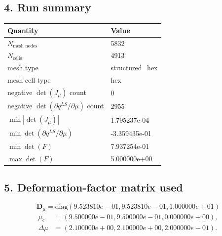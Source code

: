 \documentclass[11pt]{article}
\begin{document}
\subsection*{4. Run summary}
\begin{center}
\begin{tabular}{ll}
\toprule
Quantity & Value \\
\midrule
$N_\text{mesh nodes}$ & 5832 \\
$N_\text{cells}$ & 4913 \\
mesh type & structured_hex \\
mesh cell type & hex \\
negative $\det(J_\mu)$ count & 0 \\
negative $\det(\partial q^{LS}/\partial\mu)$ count & 2955 \\
$\min |\det(J_\mu)|$ & 1.795237e-04 \\
$\min\det(\partial q^{LS}/\partial\mu)$ & -3.359435e-01 \\
$\min\det(F)$ & 7.937254e-01 \\
$\max\det(F)$ & 5.000000e+00 \\
\bottomrule
\end{tabular}
\end{center}
\subsection*{5. Deformation-factor matrix used}
\begin{equation}
\mathbf{D}_{\mu}=\mathrm{diag}\left(9.523810e-01,9.523810e-01,1.000000e+01\right)\end{equation}
\begin{align}
\mu_c &= \left(9.500000e-01,9.500000e-01,0.000000e+00\right),\\
\Delta\mu &= \left(2.100000e+00,2.100000e+00,2.000000e-01\right).
\end{align}
\end{document}
